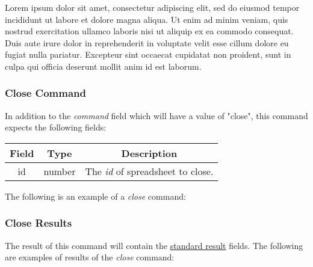 Lorem ipsum dolor sit amet, consectetur adipiscing elit, sed do eiusmod tempor incididunt ut labore et dolore magna aliqua. Ut enim ad minim veniam, quis nostrud exercitation ullamco laboris nisi ut aliquip ex ea commodo consequat. Duis aute irure dolor in reprehenderit in voluptate velit esse cillum dolore eu fugiat nulla pariatur. Excepteur sint occaecat cupidatat non proident, sunt in culpa qui officia deserunt mollit anim id est laborum.

\subsubsection{Close Command}
In addition to the \emph{command} field which will have a value of "close", this command expects the following fields:
\begin{table}[H]
    \begin{center}
        \begin{tabular}{|c|c|c|}\hline
            Field & Type & Description \\\hline
            id & number & The \emph{id} of spreadsheet to close. \\\hline
        \end{tabular}
    \end{center}
\end{table}

The following is an example of a \emph{close} command:


\subsubsection{Close Results}
The result of this command will contain the \hyperref[sec:message:result]{standard result} fields.
The following are examples of results of the \emph{close} command:




